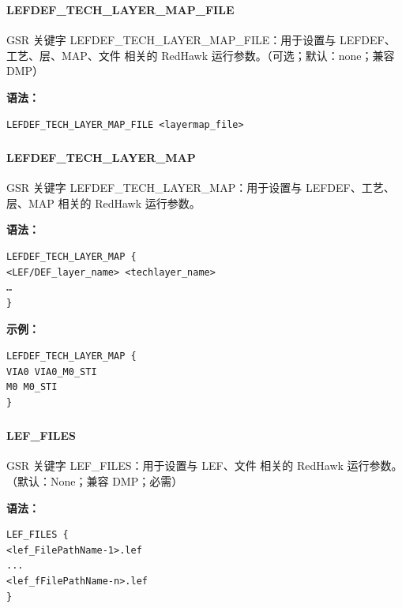 \subsubsection{}
\paragraph*{LEFDEF_TECH_LAYER_MAP_FILE}

GSR 关键字 LEFDEF_TECH_LAYER_MAP_FILE：用于设置与 LEFDEF、工艺、层、MAP、文件 相关的 RedHawk 运行参数。（可选；默认：none；兼容 DMP）

\textbf{语法：}
\begin{lstlisting}
LEFDEF_TECH_LAYER_MAP_FILE <layermap_file>
\end{lstlisting}

\subsubsection{}
\paragraph*{LEFDEF_TECH_LAYER_MAP}

GSR 关键字 LEFDEF_TECH_LAYER_MAP：用于设置与 LEFDEF、工艺、层、MAP 相关的 RedHawk 运行参数。

\textbf{语法：}
\begin{lstlisting}
LEFDEF_TECH_LAYER_MAP {
<LEF/DEF_layer_name> <techlayer_name>
…
}
\end{lstlisting}

\textbf{示例：}
\begin{lstlisting}
LEFDEF_TECH_LAYER_MAP {
VIA0 VIA0_M0_STI
M0 M0_STI
}
\end{lstlisting}

\subsubsection{}
\paragraph*{LEF_FILES}

GSR 关键字 LEF_FILES：用于设置与 LEF、文件 相关的 RedHawk 运行参数。（默认：None；兼容 DMP；必需）

\textbf{语法：}
\begin{lstlisting}
LEF_FILES {
<lef_FilePathName-1>.lef
...
<lef_fFilePathName-n>.lef
}
\end{lstlisting}


